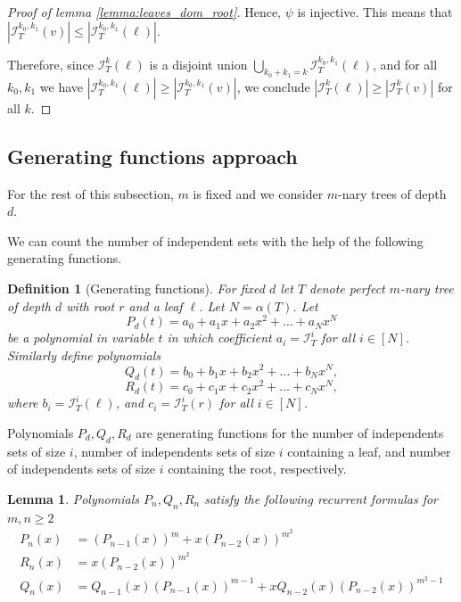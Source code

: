 \documentclass[10pt]{amsart}
\newtheorem{lemma}[theorem]{Lemma}
\newtheorem{definition}[theorem]{Definition}
\theoremstyle{definition}
\newcommand\II{{\mathcal I}}
\begin{document}
\begin{proof}[Proof of lemma \ref{lemma:leaves_dom_root}]
	Hence, $\psi$ is injective. This means that $|\mathcal{I}^{k_0,k_1}_T(v)|\leq |\mathcal{I}^{k_0,k_1}_T(\ell)|$.

	Therefore, since $\mathcal{I}_T^k(\ell)$ is a disjoint union $\bigcup_{k_0+k_1=k}\mathcal{I}_T^{k_0,k_1}(\ell)$, and for all $k_0,k_1$ we have $|\mathcal{I}^{k_0,k_1}_T(\ell)|\geq |\mathcal{I}^{k_0,k_1}_T(v)|$, we conclude $|\mathcal{I}_T^k(\ell)| \geq |\mathcal{I}_T^k(v)|$ for all $k$.
\end{proof}

\subsection{Generating functions approach}

For the rest of this subsection, $m$ is fixed and we consider $m$-nary trees of depth $d$.

We can count the number of independent sets with the help of the following generating functions.

\begin{definition}[Generating functions]
	For fixed $d$ let $T$ denote perfect $m$-nary tree of depth $d$ with root $r$ and a leaf $\ell$. Let $N=\alpha(T)$. Let $$P_{d}(t)=a_0+a_1x+a_2x^2+\ldots +a_N x^{N}$$ be a polynomial in variable $t$ in which coefficient $a_i=\II^{i}_{T}$ for all $i\in [N]$.
	Similarly define polynomials
	$$Q_d(t)=b_0+b_1x+b_2x^2+\ldots +b_N x^{N},$$
	$$R_d(t)=c_0+c_1x+c_2x^2+\ldots +c_N x^{N},$$
	where $b_i=\II^{i}_{T}(\ell)$, and $c_i=\II^{i}_T(r)$ for all $i\in[N]$.
\end{definition}

Polynomials $P_d, Q_d, R_d$ are generating functions for the number of independents sets of size $i$, number of independents sets of size $i$ containing a leaf, and number of independents sets of size $i$ containing the root, respectively.

\begin{lemma}\label{lemma:generating_def}
	Polynomials $P_n, Q_n, R_n$ satisfy the following recurrent formulas for $m, n\geq 2$
	\begin{align*}
		P_n(x) & = (P_{n - 1}(x))^m + x(P_{n - 2}(x))^{m^2}                                 \\
		R_n(x) & = x(P_{n - 2}(x))^{m^2}                                                    \\
		Q_n(x) & = Q_{n - 1}(x)(P_{n - 1}(x))^{m-1} + xQ_{n - 2}(x)(P_{n - 2}(x))^{m^2 - 1}
	\end{align*}
\end{lemma}
\end{document}
